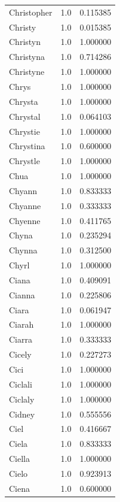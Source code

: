 \documentclass[
  letterpaper,
  DIV=11,
  numbers=noendperiod]{scrreprt}
\begin{document}
\begin{tabular}{lrr}
Christopher     &   1.0 &   0.115385 \\
Christy         &   1.0 &   0.015385 \\
Christyn        &   1.0 &   1.000000 \\
Christyna       &   1.0 &   0.714286 \\
Christyne       &   1.0 &   1.000000 \\
Chrys           &   1.0 &   1.000000 \\
Chrysta         &   1.0 &   1.000000 \\
Chrystal        &   1.0 &   0.064103 \\
Chrystie        &   1.0 &   1.000000 \\
Chrystina       &   1.0 &   0.600000 \\
Chrystle        &   1.0 &   1.000000 \\
Chua            &   1.0 &   1.000000 \\
Chyann          &   1.0 &   0.833333 \\
Chyanne         &   1.0 &   0.333333 \\
Chyenne         &   1.0 &   0.411765 \\
Chyna           &   1.0 &   0.235294 \\
Chynna          &   1.0 &   0.312500 \\
Chyrl           &   1.0 &   1.000000 \\
Ciana           &   1.0 &   0.409091 \\
Cianna          &   1.0 &   0.225806 \\
Ciara           &   1.0 &   0.061947 \\
Ciarah          &   1.0 &   1.000000 \\
Ciarra          &   1.0 &   0.333333 \\
Cicely          &   1.0 &   0.227273 \\
Cici            &   1.0 &   1.000000 \\
Ciclali         &   1.0 &   1.000000 \\
Ciclaly         &   1.0 &   1.000000 \\
Cidney          &   1.0 &   0.555556 \\
Ciel            &   1.0 &   0.416667 \\
Ciela           &   1.0 &   0.833333 \\
Ciella          &   1.0 &   1.000000 \\
Cielo           &   1.0 &   0.923913 \\
Ciena           &   1.0 &   0.600000 \\

\end{tabular}
\end{document}
